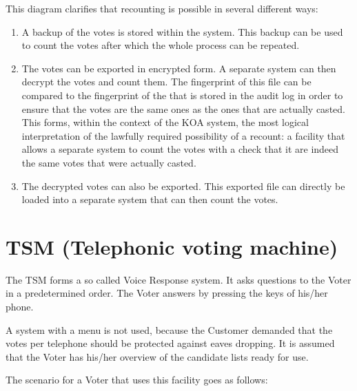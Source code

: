 \begin{itemize}
	This diagram clarifies that recounting is possible in several
	different ways:

	\begin{enumerate} 
		
	\item A backup of the votes is stored within the system. This
	backup can be used to count the votes after which the whole
	process can be repeated.

	\item The votes can be exported in encrypted form. A separate
	system can then decrypt the votes and count them. The
	fingerprint of this file can be compared to the fingerprint of
	the that is stored in the audit log in order to ensure that
	the votes are the same ones as the ones that are actually
	casted. This forms, within the context of the KOA system, the
	most logical interpretation of the lawfully required
	possibility of a recount: a facility that allows a separate
	system to count the votes with a check that it are indeed the
	same votes that were actually casted.

	\item The decrypted votes can also be exported. This exported
	file can directly be loaded into a separate system that can
	then count the votes.

	\end{enumerate}

\end{itemize}

\section{TSM (Telephonic voting machine)}\label{sec2:tsmt-voting-mach}

The TSM forms a so called Voice Response system. It asks questions to
the Voter in a predetermined order. The Voter answers by pressing the
keys of his/her phone.

A system with a menu is not used, because the Customer demanded that the
votes per telephone should be protected against eaves dropping. It is
assumed that the Voter has his/her overview of the candidate lists
ready for use. 

The scenario for a Voter that uses this facility goes as follows:

